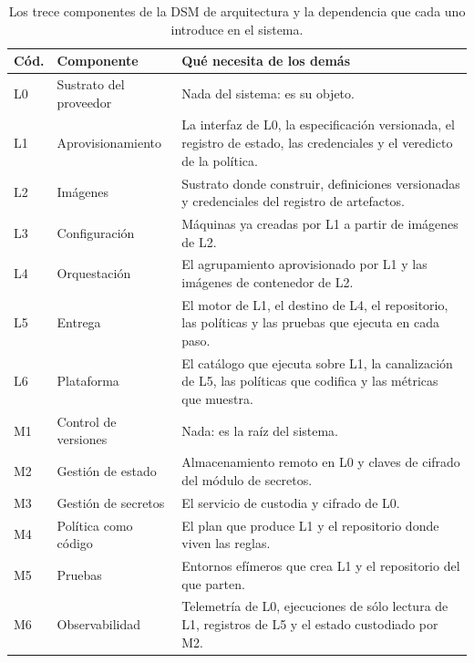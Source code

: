 \documentclass[11pt,letterpaper]{article}
\begin{document}
\begin{table}[htbp]
  \centering
  \footnotesize
  \caption{Los trece componentes de la DSM de arquitectura y la dependencia
  que cada uno introduce en el sistema.}
  \label{tab:dsmelem}
  \begin{tabularx}{\textwidth}{@{}l>{\raggedright\arraybackslash}p{}
    >{\raggedright\arraybackslash}X@{}}
    \toprule
    \textbf{Cód.} & \textbf{Componente} & \textbf{Qué necesita de los demás} \\
    \midrule
    L0 & Sustrato del proveedor & Nada del sistema: es su objeto. \\
    L1 & Aprovisionamiento & La interfaz de L0, la especificación versionada,
         el registro de estado, las credenciales y el veredicto de la
         política. \\
    L2 & Imágenes & Sustrato donde construir, definiciones versionadas y
         credenciales del registro de artefactos. \\
    L3 & Configuración & Máquinas ya creadas por L1 a partir de imágenes de
         L2. \\
    L4 & Orquestación & El agrupamiento aprovisionado por L1 y las imágenes de
         contenedor de L2. \\
    L5 & Entrega & El motor de L1, el destino de L4, el repositorio, las
         políticas y las pruebas que ejecuta en cada paso. \\
    L6 & Plataforma & El catálogo que ejecuta sobre L1, la canalización de L5,
         las políticas que codifica y las métricas que muestra. \\
    M1 & Control de versiones & Nada: es la raíz del sistema. \\
    M2 & Gestión de estado & Almacenamiento remoto en L0 y claves de cifrado
         del módulo de secretos. \\
    M3 & Gestión de secretos & El servicio de custodia y cifrado de L0. \\
    M4 & Política como código & El plan que produce L1 y el repositorio donde
         viven las reglas. \\
    M5 & Pruebas & Entornos efímeros que crea L1 y el repositorio del que
         parten. \\
    M6 & Observabilidad & Telemetría de L0, ejecuciones de sólo lectura de L1,
         registros de L5 y el estado custodiado por M2. \\
    \bottomrule
  \end{tabularx}
\end{table}
\end{document}
